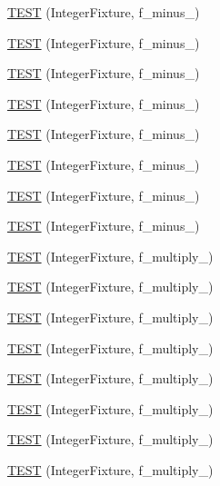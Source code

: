 \begin{DoxyCompactItemize}
\item 
\hyperlink{TestInteger_8c_09_09_a9f485a8088dedcfce34a614822126d11}{T\-E\-S\-T} (Integer\-Fixture, f\-\_\-minus\-\_)
\item 
\hyperlink{TestInteger_8c_09_09_a909dd5ab8bf98a4e34def825805a1f6d}{T\-E\-S\-T} (Integer\-Fixture, f\-\_\-minus\-\_)
\item 
\hyperlink{TestInteger_8c_09_09_aa5762bbe95c731305507c07e3b180794}{T\-E\-S\-T} (Integer\-Fixture, f\-\_\-minus\-\_)
\item 
\hyperlink{TestInteger_8c_09_09_a2c4a605ee659922c0f828d85191e2727}{T\-E\-S\-T} (Integer\-Fixture, f\-\_\-minus\-\_)
\item 
\hyperlink{TestInteger_8c_09_09_a3b44adfcc236126180bd6734f0e0286a}{T\-E\-S\-T} (Integer\-Fixture, f\-\_\-minus\-\_)
\item 
\hyperlink{TestInteger_8c_09_09_ac0aacd4e05c03b6a6c3d995a216f63e5}{T\-E\-S\-T} (Integer\-Fixture, f\-\_\-minus\-\_)
\item 
\hyperlink{TestInteger_8c_09_09_afec838c3ccfddb558ef126d8631a3f25}{T\-E\-S\-T} (Integer\-Fixture, f\-\_\-minus\-\_)
\item 
\hyperlink{TestInteger_8c_09_09_a9cd6b1d672643cef18fd7f4a0dd8c9e5}{T\-E\-S\-T} (Integer\-Fixture, f\-\_\-minus\-\_)
\item 
\hyperlink{TestInteger_8c_09_09_a23f9b2ec0bbeca6106f90b2c422c71be}{T\-E\-S\-T} (Integer\-Fixture, f\-\_\-multiply\-\_)
\item 
\hyperlink{TestInteger_8c_09_09_afbf936f5f57404921fd1c3c384628ab4}{T\-E\-S\-T} (Integer\-Fixture, f\-\_\-multiply\-\_)
\item 
\hyperlink{TestInteger_8c_09_09_a921044d19761fe313a6bd4607b8485d1}{T\-E\-S\-T} (Integer\-Fixture, f\-\_\-multiply\-\_)
\item 
\hyperlink{TestInteger_8c_09_09_ad0da936adb53c0589eb5198b8f26b322}{T\-E\-S\-T} (Integer\-Fixture, f\-\_\-multiply\-\_)
\item 
\hyperlink{TestInteger_8c_09_09_a299cac4c53289cfb82c63694fccbfb1f}{T\-E\-S\-T} (Integer\-Fixture, f\-\_\-multiply\-\_)
\item 
\hyperlink{TestInteger_8c_09_09_ab177c9c8c4b05225c41cabae2024e2f4}{T\-E\-S\-T} (Integer\-Fixture, f\-\_\-multiply\-\_)
\item 
\hyperlink{TestInteger_8c_09_09_a49afd0fa971700362e9bd2ec6a3b81ac}{T\-E\-S\-T} (Integer\-Fixture, f\-\_\-multiply\-\_)
\item 
\hyperlink{TestInteger_8c_09_09_a81774525491ff8a76fa0f0299787303a}{T\-E\-S\-T} (Integer\-Fixture, f\-\_\-multiply\-\_)

\end{DoxyCompactItemize}
